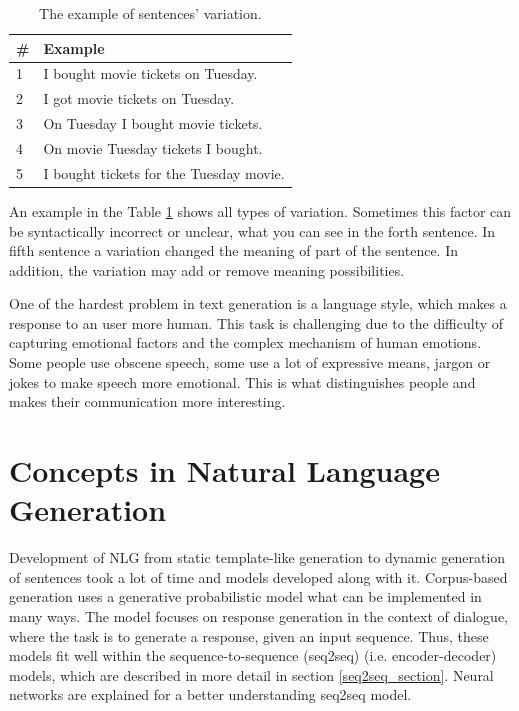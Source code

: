 \begin{table}[ht]
\centering
 \begin{tabular}{|p{0.5cm}|p{8cm}|} 
 \hline
 \textbf{\#} & \textbf{Example} \\
 \hline
 1 & I bought movie tickets on Tuesday. \\ 
 \hline
 2 & I got movie tickets on Tuesday. \\
 \hline
 3 & On Tuesday I bought movie tickets. \\
 \hline
 4 & On movie Tuesday tickets I bought. \\
 \hline
 5 & I bought tickets for the Tuesday movie. \\ 
 \hline
 \end{tabular}
 \caption{The example of sentences' variation.}
\label{tab:var_example}
\end{table}

An example in the Table \ref{tab:var_example} shows all types of variation. Sometimes this factor can be syntactically incorrect or unclear, what you can see in the forth sentence. In fifth sentence a variation changed the meaning of part of the sentence. In addition, the variation may add or remove meaning possibilities.

One of the hardest problem in text generation is a language style, which makes a response to an user more human. This task is challenging due to the difficulty of capturing emotional factors and the complex mechanism of human emotions. Some people use obscene speech, some use a lot of expressive means, jargon or jokes to make speech more emotional. This is what distinguishes people and makes their communication more interesting.

\chapter{Concepts in Natural Language Generation} \label{nlg_models}
Development of NLG from static template-like generation to dynamic generation of sentences took a lot of time and models developed along with it. Corpus-based generation uses a generative probabilistic model what can be implemented in many ways. The model focuses on response generation in the context of dialogue, where the task is to generate a response, given an input sequence. Thus, these models fit well within the sequence-to-sequence (seq2seq) (i.e. encoder-decoder) models, which are described in more detail in section \ref{seq2seq_section}. Neural networks are explained for a better understanding seq2seq model.

